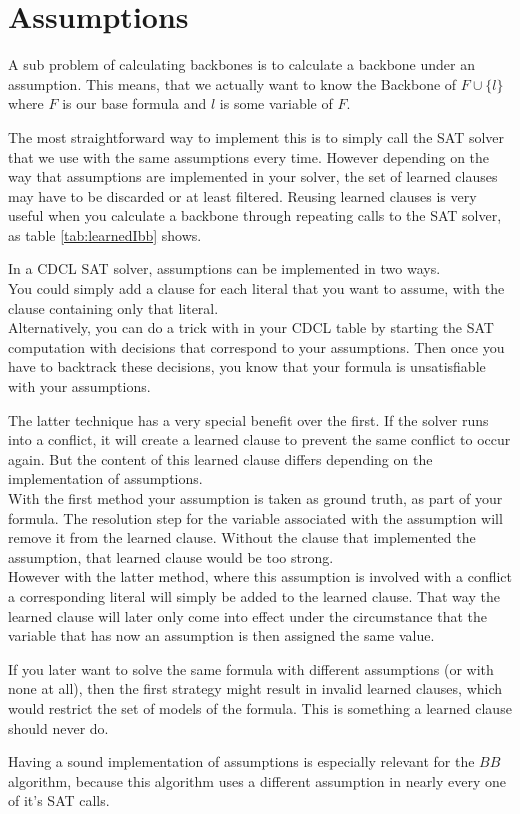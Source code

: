 \section{Assumptions}

A sub problem of calculating backbones is to calculate a backbone under an assumption. This means, that we actually want to know the Backbone of $F \cup\{l\}$ where $F$ is our base formula and $l$ is some variable of $F$.

The most straightforward way to implement this is to simply call the SAT solver that we use with the same assumptions every time. However depending on the way that assumptions are implemented in your solver, the set of learned clauses may have to be discarded or at least filtered. Reusing learned clauses is very useful when you calculate a backbone through repeating calls to the SAT solver, as table \ref{tab:learnedIbb} shows.

In a CDCL SAT solver, assumptions can be implemented in two ways. \\
You could simply add a clause for each literal that you want to assume, with the clause containing only that literal. \\
Alternatively, you can do a trick with in your CDCL table by starting the SAT computation with decisions that correspond to your assumptions. Then once you have to backtrack these decisions, you know that your formula is unsatisfiable with your assumptions.

The latter technique has a very special benefit over the first. If the solver runs into a conflict, it will create a learned clause to prevent the same conflict to occur again. But the content of this learned clause differs depending on the implementation of assumptions.\\
With the first method your assumption is taken as ground truth, as part of your formula. The resolution step for the variable associated with the assumption will remove it from the learned clause. Without the clause that implemented the assumption, that learned clause would be too strong.\\
However with the latter method, where this assumption is involved with a conflict a corresponding literal will simply be added to the learned clause. That way the learned clause will later only come into effect under the circumstance that the variable that has now an assumption is then assigned the same value.

If you later want to solve the same formula with different assumptions (or with none at all), then the first strategy might result in invalid learned clauses, which would restrict the set of models of the formula. This is something a learned clause should never do.

Having a sound implementation of assumptions is especially relevant for the $BB$ algorithm, because this algorithm uses a different assumption in nearly every one of it's SAT calls.